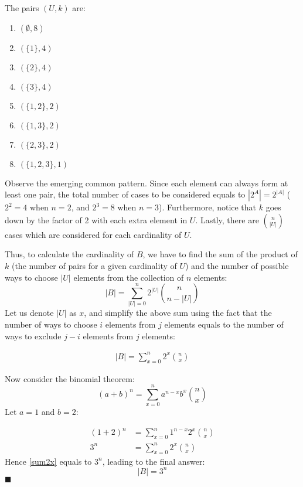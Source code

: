 \documentclass[12pt]{article}
\newcommand{\q}{\hfill $\blacksquare$}
\newenvironment{ps}
{\begin{enumerate}[leftmargin=0em, itemindent=1.5em]}
{\end{enumerate}}
\begin{document}
\begin{ps}
    The pairs \( (U, k) \) are:
    \begin{enumerate}[label=\arabic*.]
        \item \( (\emptyset, 8) \)
        \item \( (\{1\}, 4) \)
        \item \( (\{2\}, 4) \)
        \item \( (\{3\}, 4) \)
        \item \( (\{1,2\}, 2) \)
        \item \( (\{1,3\}, 2) \)
        \item \( (\{2,3\}, 2) \)
        \item \( (\{1,2,3\}, 1) \)
    \end{enumerate}

    Observe the emerging common pattern. Since each element can always form at least one pair, the
    total number of cases to be considered equals to \( |2^A| = 2^{|A|} \) (\( 2^2 = 4 \) when \( n
    = 2 \), and \( 2^3 = 8 \) when \( n = 3 \)). Furthermore, notice that \( k \) goes down by the
    factor of 2 with each extra element in \( U \). Lastly, there are \( \binom{n}{|U|} \) cases
    which are considered for each cardinality of \( U \).

    Thus, to calculate the cardinality of \( B \), we have to find the sum of the
    product of \( k \) (the number of pairs for a given cardinality of \( U \)) and the number of
    possible ways to choose \( |U| \) elements from the collection of \( n \) elements: 
    \[
        |B| = \sum_{|U|=0}^n 2^{|U|}\binom{n}{n - |U|}
    \]
    Let us denote \( |U| \) as \( x \), and simplify the above sum using the fact that the number of
    ways to choose \( i \) elements from \( j \) elements equals to the number of ways to exclude \(
    j - i \) elements from \( j \) elements:
    
    \begin{align}
        \label{sum2x}
        |B| = \sum_{x=0}^n 2^x \binom{n}{x}
    \end{align}
    
    Now consider the binomial theorem:
    \[
        (a+b)^n = \sum_{x=0}^n a^{n-x} b^x \binom{n}{x}
    \]   
    Let \( a = 1 \) and \( b = 2 \):
    
    \begin{align*}
        (1 + 2)^n &= \sum_{x=0}^n 1^{n-x}2^x \binom{n}{x}\\
        3^n &= \sum_{x=0}^n 2^x \binom{n}{x}
    \end{align*} 
    Hence \eqref{sum2x} equals to \( 3^n \), leading to the final answer:
    \[
        |B| = 3^n 
    \] \q
    

\end{ps}
\end{document}

